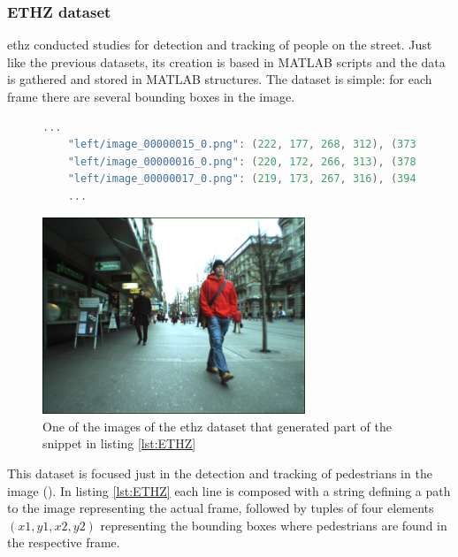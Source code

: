 \subsubsection{ETHZ dataset}
\gls{ethz} conducted studies for detection and tracking of people on the street. Just like the previous datasets, its creation is based in MATLAB scripts and the data is gathered and stored in MATLAB structures. The dataset is simple: for each frame there are several bounding boxes in the image.
\begin{figure}
\begin{center}
	\begin{lstlisting}[label={lst:ETHZ}, caption={ETHZ dataset dataset file snippet.},language=c++]
	...
	"left/image_00000015_0.png": (222, 177, 268, 312), (373, 105, 463, 393), (458, 220, 487, 285), (310, 225, 327, 265), (335, 228, 352, 264), (267, 228, 281, 261);
	"left/image_00000016_0.png": (220, 172, 266, 313), (378, 407, 476, 102), (462, 219, 486, 285), (312, 223, 327, 264), (337, 226, 352, 262), (267, 231, 279, 260);
	"left/image_00000017_0.png": (219, 173, 267, 316), (394, 94, 489, 423), (313, 222, 330, 262), (338, 227, 354, 262), (267, 228, 279, 260);
	...	\end{lstlisting}
\end{center}
\end{figure}

\begin{figure}[htp]
	
	\centering
	\includegraphics[width=0.7\textwidth]{capstate/imgs/image_00000016_0.png}
	
	\caption{One of the images of the \gls{ethz} dataset that generated part of the snippet in listing \ref{lst:ETHZ} }
	\label{fig:ETHZ}
	
\end{figure}

This dataset is focused just in the detection and tracking of pedestrians in the image (\cite{ETHZEidgenossischeTechnischeHochschuleZurich}). In listing \ref{lst:ETHZ} each line is composed with a string defining a path to the image representing the actual frame, followed by tuples of four elements $(x1,y1,x2,y2)$ representing the bounding boxes where pedestrians are found in the respective frame. 


